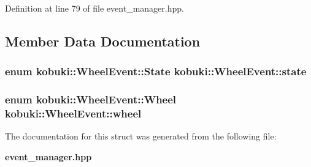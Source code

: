 \-Definition at line 79 of file event\-\_\-manager.\-hpp.



\subsection{\-Member \-Data \-Documentation}
\subsubsection[{state}]{\setlength{\rightskip}{0pt plus 5cm}enum {\bf kobuki\-::\-Wheel\-Event\-::\-State}  {\bf kobuki\-::\-Wheel\-Event\-::state}}\label{structkobuki_1_1WheelEvent_abc49fa25158af23f31bd0e8348fe2f4e}
\subsubsection[{wheel}]{\setlength{\rightskip}{0pt plus 5cm}enum {\bf kobuki\-::\-Wheel\-Event\-::\-Wheel}  {\bf kobuki\-::\-Wheel\-Event\-::wheel}}\label{structkobuki_1_1WheelEvent_a2c8867560bae32f5c74d2fa3da7acaae}


\-The documentation for this struct was generated from the following file\-:\begin{DoxyCompactItemize}
\item 
{\bf event\-\_\-manager.\-hpp}\end{DoxyCompactItemize}
